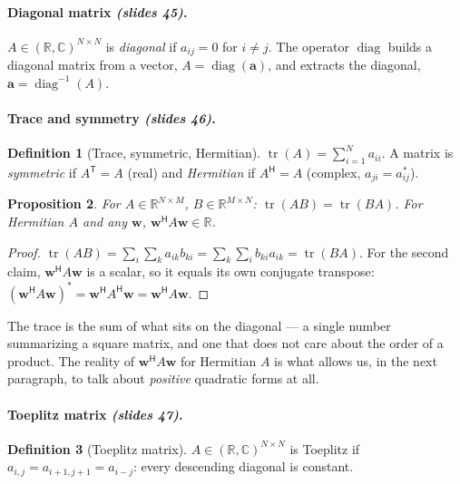 \documentclass[11pt,a4paper]{article}
\newcommand{\R}{\mathbb{R}}
\newcommand{\C}{\mathbb{C}}
\newcommand{\T}{^{\mathsf{T}}}
\newcommand{\Her}{^{\mathsf{H}}}
\newcommand{\tr}{\operatorname{tr}}
\newcommand{\diag}{\operatorname{diag}}
\newcommand{\slides}[1]{\texorpdfstring{\emph{(slides #1)}}{(slides #1)}}
\theoremstyle{definition}
\newtheorem{definition}{Definition}[section]
\theoremstyle{plain}
\newtheorem{proposition}[definition]{Proposition}
\begin{document}
\paragraph{Diagonal matrix \slides{45}.}
$A\in(\R,\C)^{N\times N}$ is \emph{diagonal} if $a_{ij}=0$ for $i\ne j$. The operator $\diag$ builds a diagonal matrix from a vector, $A=\diag(\mathbf a)$, and extracts the diagonal, $\mathbf a=\diag^{-1}(A)$.

\paragraph{Trace and symmetry \slides{46}.}
\begin{definition}[Trace, symmetric, Hermitian]
$\tr(A)=\sum_{i=1}^Na_{ii}$. A matrix is \emph{symmetric} if $A\T=A$ (real) and \emph{Hermitian} if $A\Her=A$ (complex, $a_{ji}=a_{ij}^*$).
\end{definition}

\begin{proposition}\label{prop:trace}
For $A\in\R^{N\times M}$, $B\in\R^{M\times N}$: $\tr(AB)=\tr(BA)$. For Hermitian $A$ and any $\mathbf w$, $\mathbf w\Her A\mathbf w\in\R$.
\end{proposition}
\begin{proof}
$\tr(AB)=\sum_i\sum_k a_{ik}b_{ki}=\sum_k\sum_i b_{ki}a_{ik}=\tr(BA)$. For the second claim, $\mathbf w\Her A\mathbf w$ is a scalar, so it equals its own conjugate transpose: $(\mathbf w\Her A\mathbf w)^*=\mathbf w\Her A\Her\mathbf w=\mathbf w\Her A\mathbf w$.
\end{proof}

\begin{intuition}
The trace is the sum of what sits on the diagonal --- a single number summarizing a square matrix, and one that does not care about the order of a product. The reality of $\mathbf w\Her A\mathbf w$ for Hermitian $A$ is what allows us, in the next paragraph, to talk about \emph{positive} quadratic forms at all.
\end{intuition}

\paragraph{Toeplitz matrix \slides{47}.}
\begin{definition}[Toeplitz matrix]
$A\in(\R,\C)^{N\times N}$ is Toeplitz if $a_{i,j}=a_{i+1,j+1}=a_{i-j}$: every descending diagonal is constant.
\end{definition}
\end{document}
